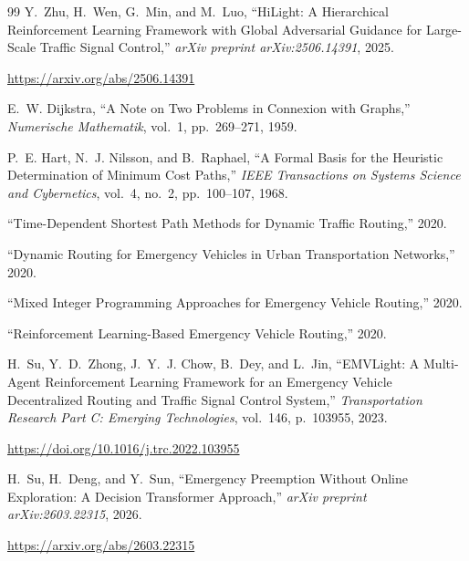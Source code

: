 \documentclass[3p,times]{elsarticle}
\theoremstyle{plain}
\theoremstyle{definition}
\begin{document}
\begin{thebibliography}{99}
Y.~Zhu, H.~Wen, G.~Min, and M.~Luo,
``HiLight: A Hierarchical Reinforcement Learning Framework with
Global Adversarial Guidance for Large-Scale Traffic Signal
Control,''
\textit{arXiv preprint arXiv:2506.14391}, 2025.

\url{https://arxiv.org/abs/2506.14391}


E.~W. Dijkstra,
``A Note on Two Problems in Connexion with Graphs,''
\textit{Numerische Mathematik},
vol.~1, pp.~269--271, 1959.

P.~E. Hart, N.~J. Nilsson, and B.~Raphael,
``A Formal Basis for the Heuristic Determination of Minimum Cost
Paths,''
\textit{IEEE Transactions on Systems Science and Cybernetics},
vol.~4, no.~2, pp.~100--107, 1968.

``Time-Dependent Shortest Path Methods for Dynamic Traffic
Routing,''
2020.

``Dynamic Routing for Emergency Vehicles in Urban Transportation
Networks,''
2020.

``Mixed Integer Programming Approaches for Emergency Vehicle
Routing,''
2020.

``Reinforcement Learning-Based Emergency Vehicle Routing,''
2020.


H.~Su, Y.~D.~Zhong, J.~Y.~J. Chow, B.~Dey, and L.~Jin,
``EMVLight: A Multi-Agent Reinforcement Learning Framework for an
Emergency Vehicle Decentralized Routing and Traffic Signal Control
System,''
\textit{Transportation Research Part C: Emerging Technologies},
vol.~146, p.~103955, 2023.

\url{https://doi.org/10.1016/j.trc.2022.103955}

H.~Su, H.~Deng, and Y.~Sun,
``Emergency Preemption Without Online Exploration: A Decision
Transformer Approach,''
\textit{arXiv preprint arXiv:2603.22315}, 2026.

\url{https://arxiv.org/abs/2603.22315}


\end{thebibliography}
\end{document}
